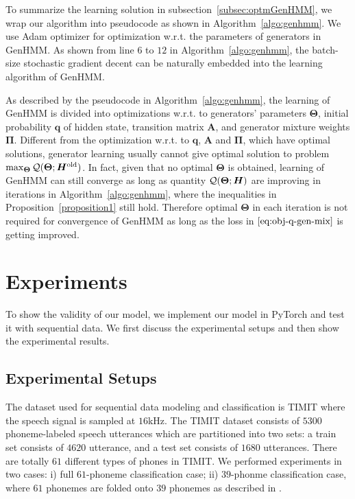 \documentclass[letterpaper]{article} %
\begin{document}
To summarize the learning solution in subsection~\ref{subsec:optmGenHMM}, we wrap our algorithm into pseudocode as shown in Algorithm~\ref{algo:genhmm}. We use Adam \cite{DBLP:journals/corr/KingmaB14} optimizer for optimization w.r.t. the parameters of generators in GenHMM. As shown from line $6$ to $12$ in Algorithm~\ref{algo:genhmm}, the batch-size stochastic gradient decent can be naturally embedded into the learning algorithm of GenHMM.

As described by the pseudocode in Algorithm~\ref{algo:genhmm}, the learning of GenHMM is divided into optimizations w.r.t. to generators' parameters $\bm{\Theta}$, initial probability $\bm{q}$ of hidden state, transition matrix $\bm{A}$, and generator mixture weights $\bm{\Pi}$. Different from the optimization w.r.t. to $\bm{q}$, $\bm{A}$ and $\bm{\Pi}$, which have optimal solutions, generator learning usually cannot give optimal solution to problem $\max_{\bm{\Theta}} \mathcal{Q}(\bm{\Theta}; \bm{H}^{\mathrm{old}})$. In fact, given that no optimal $\bm{\Theta}$ is obtained, learning of GenHMM can still converge as long as quantity $\mathcal{Q}(\bm{\Theta}; \bm{H})$ are improving in iterations in Algorithm~\ref{algo:genhmm}, where the inequalities in Proposition~\ref{proposition1} still hold. Therefore optimal $\bm{\Theta}$ in each iteration is not required for convergence of GenHMM as long as the loss in $\eqref{eq:obj-q-gen-mix}$ is getting improved.




\section{Experiments}
To show the validity of our model, we implement our model in PyTorch and test it with sequential data. We first discuss the experimental setups and then show the experimental results.

\subsection{Experimental Setups}
The dataset used for sequential data modeling and classification is TIMIT where the speech signal is sampled at $16$kHz.
The TIMIT dataset consists of $5300$ phoneme-labeled speech utterances which are partitioned into two sets: {a train set consists of $4620$ utterance, and a test set consists of $1680$ utterances.} There are totally $61$ different types of phones in TIMIT.
We performed experiments in two cases: i) full $61$-phoneme classification case; ii) $39$-phonme classification case, where $61$ phonemes are folded onto $39$ phonemes as described in \cite{Perdigao11}.
\end{document}
